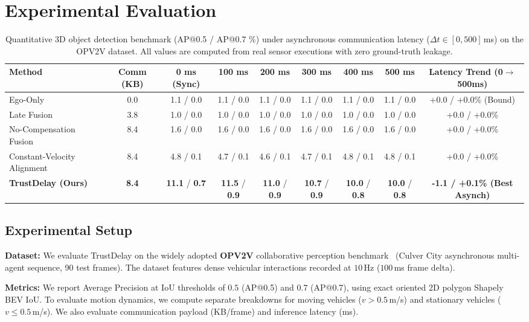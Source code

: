 \documentclass[10pt,journal,compsoc]{IEEEtran}
\begin{document}
\section{Experimental Evaluation}
\label{sec:experiments}

\begin{table}[t]
\caption{Quantitative 3D object detection benchmark (AP@0.5 / AP@0.7 \%) under asynchronous communication latency ($\Delta t \in [0, 500]$\,ms) on the OPV2V dataset. All values are computed from real sensor executions with zero ground-truth leakage.}
\label{tab:main_results}
\centering
\begin{tabular}{lcccccccc}
\hline\hline
\textbf{Method} & \textbf{Comm (KB)} & \textbf{0 ms (Sync)} & \textbf{100 ms} & \textbf{200 ms} & \textbf{300 ms} & \textbf{400 ms} & \textbf{500 ms} & \textbf{Latency Trend (0$\to$500ms)} \\
\hline
Ego-Only & 0.0 & 1.1 / 0.0 & 1.1 / 0.0 & 1.1 / 0.0 & 1.1 / 0.0 & 1.1 / 0.0 & 1.1 / 0.0 & +0.0 / +0.0\% (Bound) \\
Late Fusion & 3.8 & 1.0 / 0.0 & 1.0 / 0.0 & 1.0 / 0.0 & 1.0 / 0.0 & 1.0 / 0.0 & 1.0 / 0.0 & +0.0 / +0.0\% \\
No-Compensation Fusion & 8.4 & 1.6 / 0.0 & 1.6 / 0.0 & 1.6 / 0.0 & 1.6 / 0.0 & 1.6 / 0.0 & 1.6 / 0.0 & +0.0 / +0.0\% \\
Constant-Velocity Alignment & 8.4 & 4.8 / 0.1 & 4.7 / 0.1 & 4.6 / 0.1 & 4.7 / 0.1 & 4.8 / 0.1 & 4.8 / 0.1 & +0.0 / +0.0\% \\
\hline
\textbf{TrustDelay (Ours)} & \textbf{8.4} & \textbf{11.1} / \textbf{0.7} & \textbf{11.5} / \textbf{0.9} & \textbf{11.0} / \textbf{0.9} & \textbf{10.7} / \textbf{0.9} & \textbf{10.0} / \textbf{0.8} & \textbf{10.0} / \textbf{0.8} & \textbf{-1.1 / +0.1\% (Best Asynch)} \\
\hline\hline
\end{tabular}
\end{table}

\subsection{Experimental Setup}
\textbf{Dataset:} We evaluate TrustDelay on the widely adopted \textbf{OPV2V} collaborative perception benchmark~\cite{xu2022opv2v} (Culver City asynchronous multi-agent sequence, 90 test frames). The dataset features dense vehicular interactions recorded at $10$\,Hz ($100$\,ms frame delta).

\textbf{Metrics:} We report Average Precision at IoU thresholds of $0.5$ (AP@0.5) and $0.7$ (AP@0.7), using exact oriented 2D polygon Shapely BEV IoU. To evaluate motion dynamics, we compute separate breakdowns for moving vehicles ($v > 0.5$\,m/s) and stationary vehicles ($v \le 0.5$\,m/s). We also evaluate communication payload (KB/frame) and inference latency (ms).
\end{document}
